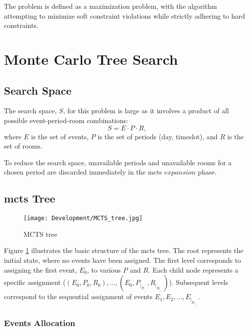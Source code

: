 The problem is defined as a maximization problem, with the algorithm attempting to minimize soft constraint violations while strictly adhering to hard constraints.

\section{Monte Carlo Tree Search}



\subsection{Search Space}

The search space, \(S\),  for this problem is large as it involves a product of all possible event-period-room combinations: \[S = E \cdot P  \cdot R,\] where \(E\) is the set of events, \(P\) is the set of periods (day, timeslot), and \(R\) is the set of rooms.

To reduce the search space, unavailable periods and unavailable rooms for a chosen period are discarded immediately in the \ac{mcts} \(expansion\) phase.

\subsection{\ac{mcts} Tree}

\begin{figure}
      \centering
      \texttt{[image: Development/MCTS\_tree.jpg]}
      \caption[MCTS tree]
      {MCTS tree}
      \label{fig:mcts_tree}
\end{figure}

Figure \ref{fig:mcts_tree} illustrates the basic structure of the \ac{mcts} tree. The root represents the initial state, where no events have been assigned. The first level corresponds to assigning the first event, \(E_0\), to various \(P\) and \(R\). Each child node represents a specific assignment (\((E_0,P_0,R_0),...,(E_0,P_|_P_|_-_1,R_|_R_|_-_1)\)). Subsequent levels correspond to the sequential assignment of events \(E_1, E_2, ..., E_|_E_|_-_1\).

\subsubsection{Events Allocation}

